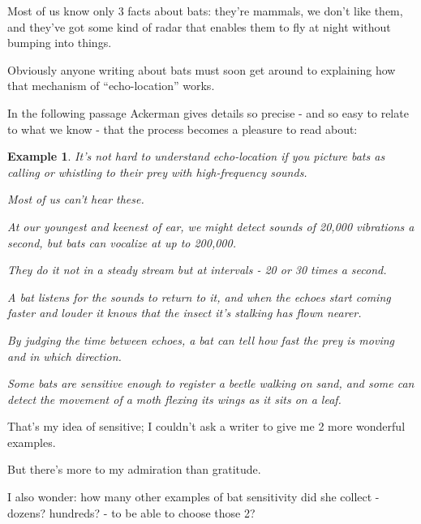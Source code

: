 \documentclass{book}
\numberwithin{equation}{section}
\newtheorem{example}{Example}[chapter]
\begin{document}
Most of us know only 3 facts about bats: they're mammals, we don't like them, and they've got some kind of radar that enables them to fly at night without bumping into things.

Obviously anyone writing about bats must soon get around to explaining how that mechanism of ``echo-location'' works.

In the following passage Ackerman gives details so precise - and so easy to relate to what we know - that the process becomes a pleasure to read about:
\begin{example}
    It's not hard to understand echo-location if you picture bats as calling or whistling to their prey with high-frequency sounds.
    
    Most of us can't hear these.
    
    At our youngest and keenest of ear, we might detect sounds of 20,000 vibrations a second, but bats can vocalize at up to 200,000.
    
    They do it not in a steady stream but at intervals - 20 or 30 times a second.
    
    A bat listens for the sounds to return to it, and when the echoes start coming faster and louder it knows that the insect it's stalking has flown nearer.
    
    By judging the time between echoes, a bat can tell how fast the prey is moving and in which direction.
    
    Some bats are sensitive enough to register a beetle walking on sand, and some can detect the movement of a moth flexing its wings as it sits on a leaf.
\end{example}
That's my idea of sensitive; I couldn't ask a writer to give me 2 more wonderful examples.

But there's more to my admiration than gratitude.

I also wonder: how many other examples of bat sensitivity did she collect - dozens? hundreds? - to be able to choose those 2?

\end{document}
